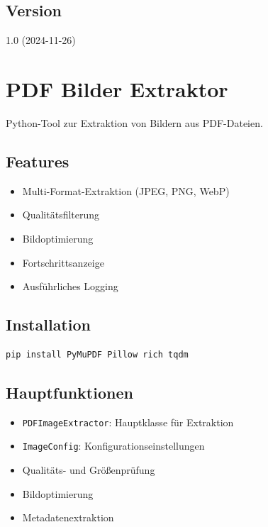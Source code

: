 \documentclass{content/vorlage-design-main}
\begin{document}
\subsection{Version}\label{version-2}

1.0 (2024-11-26)

\section{PDF Bilder Extraktor}\label{pdf-bilder-extraktor}

Python-Tool zur Extraktion von Bildern aus PDF-Dateien.

\subsection{Features}\label{features-3}

\begin{itemize}

\item
  Multi-Format-Extraktion (JPEG, PNG, WebP)
\item
  Qualitätsfilterung
\item
  Bildoptimierung
\item
  Fortschrittsanzeige
\item
  Ausführliches Logging
\end{itemize}

\subsection{Installation}\label{installation-2}

\begin{lstlisting}[language=bash]
pip install PyMuPDF Pillow rich tqdm
\end{lstlisting}

\subsection{Hauptfunktionen}\label{hauptfunktionen-1}

\begin{itemize}

\item
  \verb|PDFImageExtractor|: Hauptklasse für
  Extraktion
\item
  \verb|ImageConfig|: Konfigurationseinstellungen
\item
  Qualitäts- und Größenprüfung
\item
  Bildoptimierung
\item
  Metadatenextraktion
\end{itemize}
\end{document}
